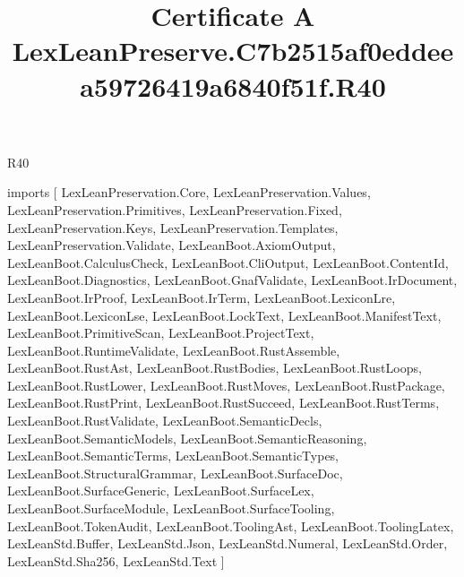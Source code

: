 \begin{lexlean}{R40}
\title{Certificate A LexLeanPreserve.C7b2515af0eddeea59726419a6840f51f.R40}
\begin{coremodule}
imports [
  LexLeanPreservation.Core,
  LexLeanPreservation.Values,
  LexLeanPreservation.Primitives,
  LexLeanPreservation.Fixed,
  LexLeanPreservation.Keys,
  LexLeanPreservation.Templates,
  LexLeanPreservation.Validate,
  LexLeanBoot.AxiomOutput,
  LexLeanBoot.CalculusCheck,
  LexLeanBoot.CliOutput,
  LexLeanBoot.ContentId,
  LexLeanBoot.Diagnostics,
  LexLeanBoot.GnafValidate,
  LexLeanBoot.IrDocument,
  LexLeanBoot.IrProof,
  LexLeanBoot.IrTerm,
  LexLeanBoot.LexiconLre,
  LexLeanBoot.LexiconLse,
  LexLeanBoot.LockText,
  LexLeanBoot.ManifestText,
  LexLeanBoot.PrimitiveScan,
  LexLeanBoot.ProjectText,
  LexLeanBoot.RuntimeValidate,
  LexLeanBoot.RustAssemble,
  LexLeanBoot.RustAst,
  LexLeanBoot.RustBodies,
  LexLeanBoot.RustLoops,
  LexLeanBoot.RustLower,
  LexLeanBoot.RustMoves,
  LexLeanBoot.RustPackage,
  LexLeanBoot.RustPrint,
  LexLeanBoot.RustSucceed,
  LexLeanBoot.RustTerms,
  LexLeanBoot.RustValidate,
  LexLeanBoot.SemanticDecls,
  LexLeanBoot.SemanticModels,
  LexLeanBoot.SemanticReasoning,
  LexLeanBoot.SemanticTerms,
  LexLeanBoot.SemanticTypes,
  LexLeanBoot.StructuralGrammar,
  LexLeanBoot.SurfaceDoc,
  LexLeanBoot.SurfaceGeneric,
  LexLeanBoot.SurfaceLex,
  LexLeanBoot.SurfaceModule,
  LexLeanBoot.SurfaceTooling,
  LexLeanBoot.TokenAudit,
  LexLeanBoot.ToolingAst,
  LexLeanBoot.ToolingLatex,
  LexLeanStd.Buffer,
  LexLeanStd.Json,
  LexLeanStd.Numeral,
  LexLeanStd.Order,
  LexLeanStd.Sha256,
  LexLeanStd.Text
]


\end{coremodule}
\end{lexlean}
